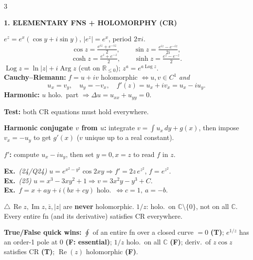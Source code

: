\documentclass[a4paper,8pt]{extarticle}
\newcommand{\topic}[2]{%
  \vspace{4.5pt}%
  {\colorbox{#1}{\parbox{\dimexpr\columnwidth-2\fboxsep}{\color{white}\bfseries\footnotesize #2}}}\par\vspace{2.5pt}}
\newcommand{\warn}{\textcolor{cWarn}{\textbf{\textwarning\,}}}
\newcommand{\textwarning}{$\triangle$}
\newcommand{\exo}{\textbf{\textcolor{cA}{Ex.}}\ }
\newcommand{\R}{\mathbb{R}}
\newcommand{\C}{\mathbb{C}}
\renewcommand{\Re}{\operatorname{Re}}
\renewcommand{\Im}{\operatorname{Im}}
\newcommand{\Arg}{\operatorname{Arg}}
\begin{document}
\begin{multicols}{3}
\topic{cA}{1. ELEMENTARY FNS + HOLOMORPHY (CR)}
$e^z=e^x(\cos y+i\sin y)$, $|e^z|=e^x$, period $2\pi i$.
\[ \cos z=\tfrac{e^{iz}+e^{-iz}}2,\qquad \sin z=\tfrac{e^{iz}-e^{-iz}}{2i},\]
\[ \cosh z=\tfrac{e^z+e^{-z}}2,\qquad \sinh z=\tfrac{e^z-e^{-z}}2.\]
$\operatorname{Log}z=\ln|z|+i\Arg z$ (cut on $\R_{\le0}$); $z^a=e^{a\operatorname{Log}z}$.\\
\textbf{Cauchy--Riemann:} $f=u+iv$ holomorphic $\iff u,v\in C^1$ \emph{and}
\[ \boxed{u_x=v_y,\quad u_y=-v_x},\quad f'(z)=u_x+iv_x=u_x-iu_y.\]
\textbf{Harmonic:} $u$ holo.\ part $\Rightarrow \Delta u=u_{xx}+u_{yy}=0$.
\begin{recipe}
\item \textbf{Test:} both CR equations must hold everywhere.
\item \textbf{Harmonic conjugate $v$ from $u$:} integrate $v=\int u_x\,dy+g(x)$, then impose $v_x=-u_y$ to get $g'(x)$ ($v$ unique up to a real constant).
\item \textbf{$f'$:} compute $u_x-iu_y$, then set $y=0,x=z$ to read $f$ in $z$.
\end{recipe}
\begin{ex}
\exo \emph{(24/Q24)} $u=e^{x^2-y^2}\cos2xy\Rightarrow f'=2z\,e^{z^2}$, $f=e^{z^2}$.\\
\exo \emph{(25)} $u=x^3{-}3xy^2{+}1\Rightarrow v=3x^2y{-}y^3{+}C$.\\
\exo $f=x{+}ay{+}i(bx{+}cy)$ holo.\ $\iff c{=}1,\ a{=}{-}b$.
\end{ex}
\begin{tip}\warn $\Re z,\Im z,\bar z,|z|$ are \textbf{never} holomorphic. $1/z$: holo.\ on $\C\setminus\{0\}$, not on all $\C$. Every entire fn (and its derivative) satisfies CR everywhere.\end{tip}
\begin{tip}\textbf{True/False quick wins:} $\oint$ of an entire fn over a closed curve $=0$ \textbf{(T)}; $e^{1/z}$ has an order-1 pole at $0$ \textbf{(F: essential)}; $1/z$ holo.\ on all $\C$ \textbf{(F)}; deriv.\ of $z\cos z$ satisfies CR \textbf{(T)}; $\Re(z)$ holomorphic \textbf{(F)}.\end{tip}


\end{multicols}
\end{document}
